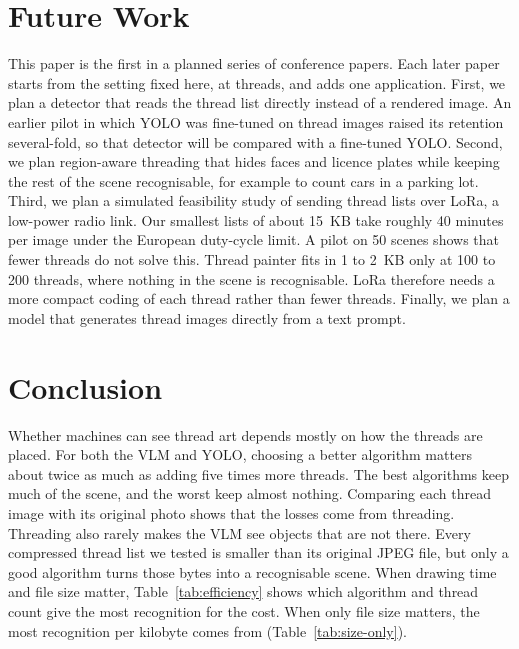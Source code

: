\documentclass[conference]{IEEEtran}
\providecommand{\SizeOnlyBest}{}\providecommand{\SizeOnlyBestVlm}{}\providecommand{\SizeOnlyBestYolo}{}\providecommand{\SizeOnlyVlmY}{0}\providecommand{\SizeOnlyYoloY}{0}
\providecommand{\CarryThreads}{}\providecommand{\CarryKB}{}\providecommand{\CarryVlm}{}\providecommand{\CarryYolo}{}
\begin{document}
\section{Future Work}
\label{sec:future}

This paper is the first in a planned series of conference papers. Each later paper starts from the setting fixed here, \SizeOnlyBest{} at \CarryThreads{} threads, and adds one application. First, we plan a detector that reads the thread list directly instead of a rendered image. An earlier pilot in which YOLO was fine-tuned on thread images raised its retention several-fold, so that detector will be compared with a fine-tuned YOLO. Second, we plan region-aware threading that hides faces and licence plates while keeping the rest of the scene recognisable, for example to count cars in a parking lot. Third, we plan a simulated feasibility study of sending thread lists over LoRa, a low-power radio link. Our smallest lists of about 15~KB take roughly 40 minutes per image under the European duty-cycle limit. A pilot on 50 scenes shows that fewer threads do not solve this. Thread painter fits in 1 to 2~KB only at 100 to 200 threads, where nothing in the scene is recognisable. LoRa therefore needs a more compact coding of each thread rather than fewer threads. Finally, we plan a model that generates thread images directly from a text prompt.

\section{Conclusion}
\label{sec:conclusion}

Whether machines can see thread art depends mostly on how the threads are placed. For both the VLM and YOLO, choosing a better algorithm matters about twice as much as adding five times more threads. The best algorithms keep much of the scene, and the worst keep almost nothing. Comparing each thread image with its original photo shows that the losses come from threading. Threading also rarely makes the VLM see objects that are not there. Every compressed thread list we tested is smaller than its original JPEG file, but only a good algorithm turns those bytes into a recognisable scene. When drawing time and file size matter, Table~\ref{tab:efficiency} shows which algorithm and thread count give the most recognition for the cost. When only file size matters, the most recognition per kilobyte comes from \SizeOnlyBest{} (Table~\ref{tab:size-only}).
\end{document}
